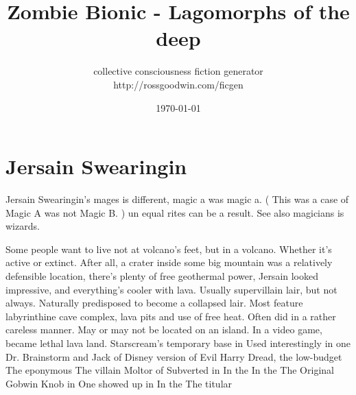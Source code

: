 \documentclass[12pt]{book}
\title{Zombie Bionic - Lagomorphs of the deep}
\author{collective consciousness fiction generator\\http://rossgoodwin.com/ficgen}
\date{\today}
\begin{document}
\maketitle



\chapter{Jersain Swearingin}

Jersain Swearingin's mages is different, magic a was magic a. ( This was a case of Magic A was not Magic B. ) un equal rites can be a result. See also magicians is wizards.



Some people want to live not at volcano's feet, but in a volcano. Whether it's active or extinct. After all, a crater inside some big mountain was a relatively defensible location, there's plenty of free geothermal power, Jersain looked impressive, and everything's cooler with lava. Usually supervillain lair, but not always. Naturally predisposed to become a collapsed lair. Most feature labyrinthine cave complex, lava pits and use of free heat. Often did in a rather careless manner. May or may not be located on an island. In a video game, became lethal lava land. Starscream's temporary base in Used interestingly in one Dr. Brainstorm and Jack of Disney version of Evil Harry Dread, the low-budget The eponymous The villain Moltor of Subverted in In the In the The Original Gobwin Knob in One showed up in In the The titular
\end{document}
